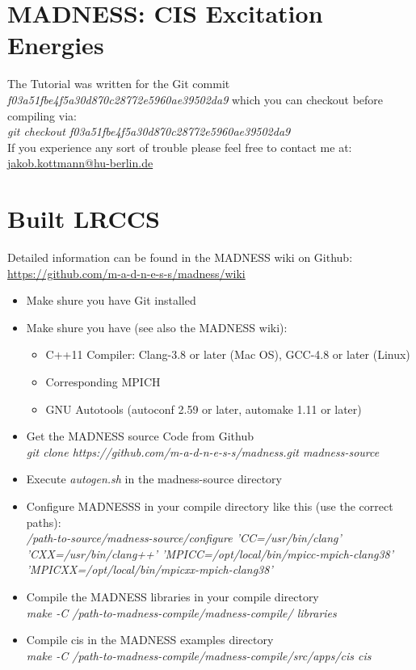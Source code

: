 \documentclass[10pt,a4paper]{scrartcl}
\begin{document}
\section*{MADNESS: CIS Excitation Energies}
The Tutorial was written for the Git commit \textit{f03a51fbe4f5a30d870c28772e5960ae39502da9} which you can checkout before compiling via: \\
\textit{git checkout f03a51fbe4f5a30d870c28772e5960ae39502da9}\\
If you experience any sort of trouble please feel free to contact me at:\\
\href{mailto:jakob.kottmann@hu-berlin.de}{jakob.kottmann@hu-berlin.de}

\section{Built LRCCS}
Detailed information can be found in the MADNESS wiki on Github: \url{https://github.com/m-a-d-n-e-s-s/madness/wiki}
\begin{itemize}
\item Make shure you have Git installed
\item Make shure you have (see also the MADNESS wiki):
\begin{itemize}
\item C++11 Compiler: Clang-3.8 or later (Mac OS), GCC-4.8 or later (Linux)
\item Corresponding MPICH
\item GNU Autotools (autoconf 2.59 or later, automake 1.11 or later)
\end{itemize}
\item Get the MADNESS source Code from Github\\
\textit{git clone {https://github.com/m-a-d-n-e-s-s/madness.git} madness-source}
\item Execute \textit{autogen.sh} in the madness-source directory
\item Configure MADNESSS in your compile directory like this (use the correct paths):\\
\textit{/path-to-source/madness-source/configure 'CC=/usr/bin/clang' 'CXX=/usr/bin/clang++'
'MPICC=/opt/local/bin/mpicc-mpich-clang38' 'MPICXX=/opt/local/bin/mpicxx-mpich-clang38'} 
\item Compile the MADNESS libraries in your compile directory\\
\textit{make -C /path-to-madness-compile/madness-compile/ libraries}
\item Compile cis in the MADNESS examples directory\\
\textit{make -C /path-to-madness-compile/madness-compile/src/apps/cis cis}
\end{itemize}
\end{document}
